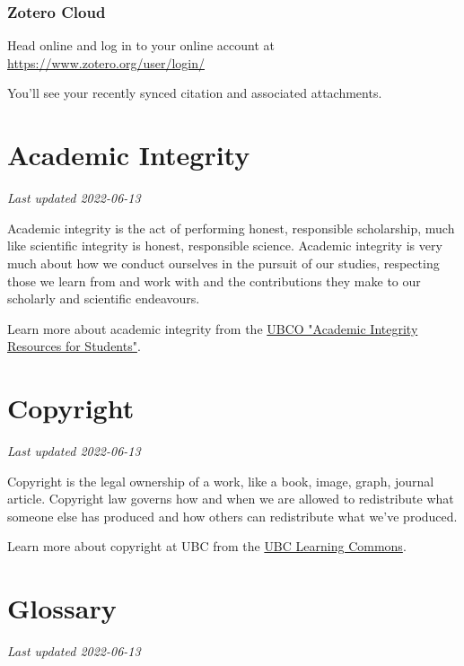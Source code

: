 \documentclass[
]{book}
\begin{document}
\hypertarget{zotero-cloud}{%
\subsection*{Zotero Cloud}\label{zotero-cloud}}

Head online and log in to your online account at \url{https://www.zotero.org/user/login/}

You'll see your recently synced citation and associated attachments.

\hypertarget{academic-integrity}{%
\chapter{Academic Integrity}\label{academic-integrity}}

\emph{Last updated 2022-06-13}

Academic integrity is the act of performing honest, responsible scholarship, much like scientific integrity is honest, responsible science. Academic integrity is very much about how we conduct ourselves in the pursuit of our studies, respecting those we learn from and work with and the contributions they make to our scholarly and scientific endeavours.

Learn more about academic integrity from the \href{https://students.ok.ubc.ca/academic-success/learning-hub/online-resources/academic-integrity/}{UBCO "Academic Integrity Resources for Students"}.

\hypertarget{copyright-1}{%
\chapter{Copyright}\label{copyright-1}}

\emph{Last updated 2022-06-13}

Copyright is the legal ownership of a work, like a book, image, graph, journal article. Copyright law governs how and when we are allowed to redistribute what someone else has produced and how others can redistribute what we've produced.

Learn more about copyright at UBC from the \href{https://copyright.ubc.ca/}{UBC Learning Commons}.

\hypertarget{glossary}{%
\chapter{Glossary}\label{glossary}}

\emph{Last updated 2022-06-13}
\end{document}
